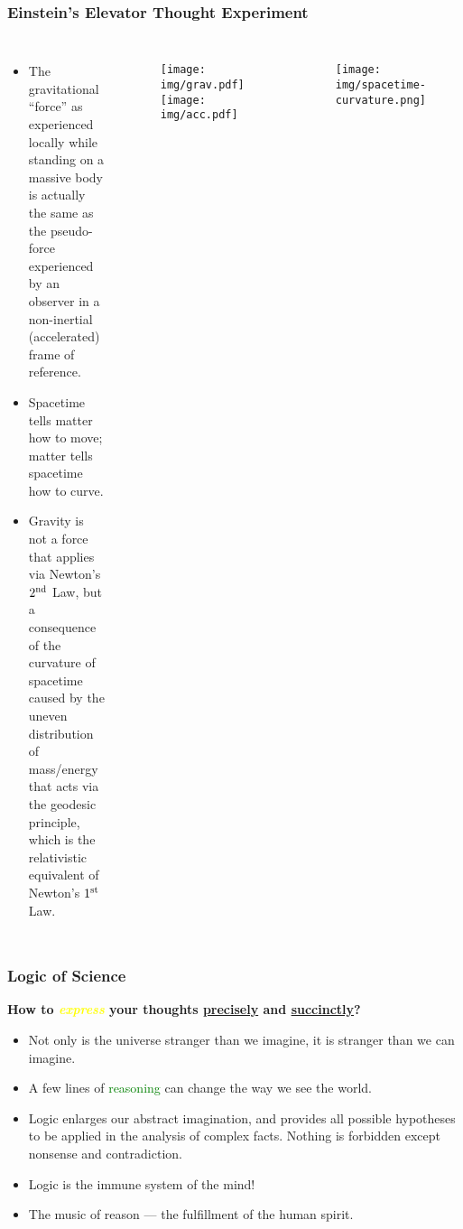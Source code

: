 \documentclass[UTF8,aspectratio=43,11pt,colorlinks,compress,openany]{beamer}%
\begin{document}
\begin{frame}\frametitle{Einstein's Elevator Thought Experiment}
	\begin{columns}\hspace{-9pt}
			\begin{itemize}
				\item The gravitational ``force'' as experienced locally while standing on a massive body is actually the same as the pseudo-force experienced by an observer in a non-inertial (accelerated) frame of reference.
				\item Spacetime tells matter how to move; matter tells spacetime how to curve.
				\item Gravity is not a force that applies via Newton's $2\textsuperscript{nd}$ Law, but a consequence of the curvature of spacetime caused by the uneven distribution of mass/energy that acts via the geodesic principle, which is the relativistic equivalent of Newton's $1\textsuperscript{st}$ Law.
			\end{itemize}
		\vspace{-5pt}
			\begin{figure}
			\texttt{[image: img/grav.pdf]}
				\texttt{[image: img/acc.pdf]}
			\end{figure}
			\begin{figure}
				\texttt{[image: img/spacetime-curvature.png]}
			\end{figure}
	\end{columns}
\end{frame}

\begin{frame}\frametitle{Logic of Science}
	\begin{block}{}
		\begin{center}
			\textbf{\large{How to \textcolor{yellow}{\textit{express}} your thoughts \underline{precisely} and \underline{succinctly}?}}
		\end{center}
	\end{block}
	\begin{itemize}
		\item Not only is the universe stranger than we imagine, it is stranger than we can imagine.
		\item A few lines of \textcolor{green}{reasoning} can change the way we see the world.
		\item Logic enlarges our abstract imagination, and provides all possible hypotheses to be applied in the analysis of complex facts. Nothing is forbidden except nonsense and contradiction.
		\item Logic is the immune system of the mind!
		\item The music of reason --- the fulfillment of the human spirit.
	\end{itemize}
\end{frame}
\end{document}
